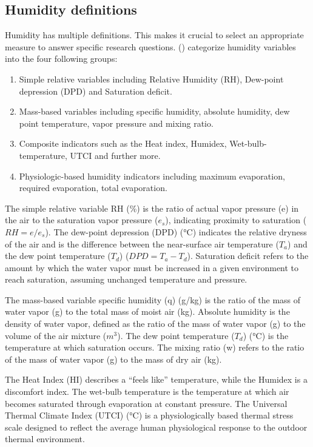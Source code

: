 \documentclass[
]{krantz}
\providecommand{\tightlist}{%
  \setlength{\itemsep}{0pt}\setlength{\parskip}{0pt}}
\begin{document}
\subsection{Humidity definitions}\label{humidity-definitions}

Humidity has multiple definitions. This makes it crucial to select an appropriate measure to answer specific research questions. (\citet{bald}) categorize humidity variables into the four following groups:

\begin{enumerate}
\def\labelenumi{\arabic{enumi}.}
\tightlist
\item
  Simple relative variables including Relative Humidity (RH), Dew-point depression (DPD) and Saturation deficit.\\
\item
  Mass-based variables including specific humidity, absolute humidity, dew point temperature, vapor pressure and mixing ratio.\\
\item
  Composite indicators such as the Heat index, Humidex, Wet-bulb-temperature, UTCI and further more.\\
\item
  Physiologic-based humidity indicators including maximum evaporation, required evaporation, total evaporation.
\end{enumerate}

The simple relative variable RH (\%) is the ratio of actual vapor pressure (e) in the air to the saturation vapor pressure (\(e_s\)), indicating proximity to saturation (\(RH=e/e_s\)). The dew-point depression (DPD) (°C) indicates the relative dryness of the air and is the difference between the near-surface air temperature (\(T_a\)) and the dew point temperature (\(T_d\)) (\(DPD=T_a-T_d\)). Saturation deficit refers to the amount by which the water vapor must be increased in a given environment to reach saturation, assuming unchanged temperature and pressure.

The mass-based variable specific humidity (q) (g/kg) is the ratio of the mass of water vapor (g) to the total mass of moist air (kg). Absolute humidity is the density of water vapor, defined as the ratio of the mass of water vapor (g) to the volume of the air mixture (\(m^3\)). The dew point temperature (\(T_d\)) (°C) is the temperature at which saturation occurs. The mixing ratio (w) refers to the ratio of the mass of water vapor (g) to the mass of dry air (kg).

The Heat Index (HI) describes a ``feels like'' temperature, while the Humidex is a discomfort index. The wet-bulb temperature is the temperature at which air becomes saturated through evaporation at constant pressure. The Universal Thermal Climate Index (UTCI) (°C) is a physiologically based thermal stress scale designed to reflect the average human physiological response to the outdoor thermal environment.
\end{document}
